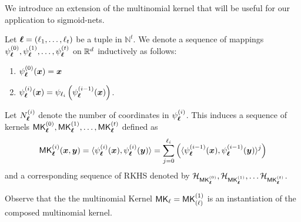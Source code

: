 We introduce an extension of the multinomial kernel that will be useful for our application to sigmoid-nets.
\begin{definition}
\label{def:composed_multinomial_kernel}
    Let $\boldsymbol{\ell}=(\ell_1,\ldots,\ell_t)$ be a tuple in $\mathbb{N}^{t}$. We denote a sequence of mappings $\psi^{(0)}_{\boldsymbol{\ell}},\psi^{(1)}_{\boldsymbol{\ell}},\ldots,\psi^{(t)}_{\boldsymbol{\ell}}$ on $\mathbb{R}^{d}$ inductively as follows:
    \begin{enumerate}
        \item $\psi^{(0)}_{\boldsymbol{\ell}}({\bm{x}})={\bm{x}}$ 
        \item $\psi^{(i)}_{\boldsymbol{\ell}}({\bm{x}})=\psi_{\ell_i}\left(\psi^{(i-1)}_{\boldsymbol{\ell}}({\bm{x}})\right)$.
    \end{enumerate}
    Let $N_{\boldsymbol{\ell}}^{(i)}$ denote the number of coordinates in $\psi_{\boldsymbol{\ell}}^{(i)}$.
    This induces a sequence of kernels $\mathsf{MK}_{\boldsymbol{\ell}}^{(0)},\mathsf{MK}_{\boldsymbol{\ell}}^{(1)},\ldots,\mathsf{MK}_{\boldsymbol{\ell}}^{(t)}$ defined as 
    \[
    \mathsf{MK}_{\boldsymbol{\ell}}^{(i)}({\bm{x}},{\bm{y}})=\langle\psi_{\boldsymbol{\ell}}^{(i)}({\bm{x}}),\psi_{\boldsymbol{\ell}}^{(i)}({\bm{y}})\rangle=\sum_{j=0}^{\ell_{i}}\left(\langle\psi_{\boldsymbol{\ell}}^{(i-1)}({\bm{x}}),\psi_{\boldsymbol{\ell}}^{(i-1)}({\bm{y}})\rangle^j\right)
    \] and a corresponding sequence of RKHS denoted by $\mathcal{H}_{\mathsf{MK}_{\boldsymbol{\ell}}^{(0)}},\mathcal{H}_{\mathsf{MK}_{\boldsymbol{\ell}}^{(1)}},\ldots \mathcal{H}_{\mathsf{MK}_{\boldsymbol{\ell}}^{(t)}}$.

    Observe that the the multinomial Kernel $\mathsf{MK}_{\ell}=\mathsf{MK}^{(1)}_{(\ell)}$ is an instantiation of the composed multinomial kernel.
\end{definition}

